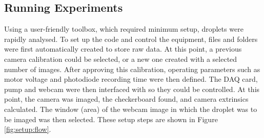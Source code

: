 \documentclass{physics_article_B}
\begin{document}
    \subsection{Running Experiments\label{sect:method:exp}}
        
        Using a user-friendly toolbox, which required minimum setup, droplets were rapidly analysed. To set up the code and control the equipment, files and folders were first automatically created to store raw data. At this point, a previous camera calibration could be selected, or a new one created with a selected number of images. After approving this calibration, operating parameters such as motor voltage and photodiode recording time were then defined. The DAQ card, pump and webcam were then interfaced with so they could be controlled. At this point, the camera was imaged, the checkerboard found, and camera extrinsics calculated. The window (area) of the webcam image in which the droplet was to be imaged was then selected. These setup steps are shown in Figure \ref{fig:setup:flow}.
        
\end{document}
